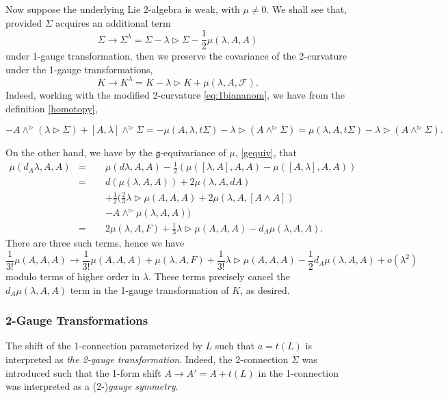 \documentclass[onecolumn]{article}
\theoremstyle{theorem}
\theoremstyle{remark}
\theoremstyle{example}
\theoremstyle{definition}
\numberwithin{equation}{section}
\def\g{\mathfrak g}
\begin{document}
Now suppose the underlying Lie 2-algebra is weak, with $\mu\neq 0$. We shall see that, provided $\Sigma$ acquires an additional term \cite{Kim:2019owc}
\begin{equation}
    \Sigma\rightarrow \Sigma^\lambda = \Sigma- \lambda\rhd\Sigma - \frac{1}{2}\mu(\lambda,A,A)\label{modified1gau}
\end{equation}
under 1-gauge transformation, then we preserve the covariance of the 2-curvature under the 1-gauge transformations,
\begin{equation}
    K\rightarrow K^\lambda = K - \lambda\rhd K + \mu(\lambda,A,\mathcal{F}).\nonumber
\end{equation}
{Indeed,} working with the modified 2-curvature  \eqref{eq:1biananom}, we have from the definition  \eqref{homotopy},
\begin{small}
\begin{equation}
    -A\wedge^\rhd(\lambda\rhd\Sigma) + [A,\lambda]\wedge^\rhd\Sigma = -\mu(A,\lambda,t\Sigma) - \lambda\rhd(A\wedge^\rhd\Sigma)= \mu(\lambda,A,t\Sigma) - \lambda\rhd(A\wedge^\rhd\Sigma).
\end{equation}\end{small}
{On} the other hand, we have by the $\g$-equivariance of $\mu$, \eqref{gequiv}, that
\begin{eqnarray}
    \mu(d_A\lambda,A,A) &=& \mu(d\lambda,A,A) - \frac{1}{2}(\mu([\lambda,A],A,A) - \mu([A,\lambda],A,A)) \nonumber\\
    &=& d(\mu(\lambda,A,A)) + 2\mu(\lambda,A,dA)\nonumber\\
    &\qquad& + \frac{1}{2}(\frac{2}{3}\lambda\rhd\mu(A,A,A)+2\mu(\lambda,A,[A\wedge A]) \nonumber\\
    &\qquad&-A\wedge^\rhd\mu(\lambda,A,A))\nonumber\\
    &=& 2\mu(\lambda,A,F)+\frac{1}{3}\lambda\rhd\mu(A,A,A)-d_A\mu(\lambda,A,A).\nonumber
\end{eqnarray}
{There} are three such terms, hence we have
\begin{equation}
    \frac{1}{3!}\mu(A,A,A)\rightarrow  \frac{1}{3!}\mu(A,A,A)+\mu(\lambda,A,F) +\frac{1}{3!}\lambda\rhd\mu(A,A,A)- \frac{1}{2}d_A\mu(\lambda,A,A) + o(\lambda^2)\nonumber 
\end{equation}
modulo terms of higher order in $\lambda$. These terms precisely cancel the $d_A\mu(\lambda,A,A)$ term in the 1-gauge transformation of $K$, as desired.


\subsubsection{2-Gauge Transformations}
The shift of the 1-connection parameterized by $L$ such that $a=t(L)$ is interpreted as \textit{{the 2-gauge transformation}}. Indeed, the 2-connection $\Sigma$ was introduced such that the 1-form shift $A\rightarrow A'=A+t(L)$ in the 1-connection was interpreted as a (2-)\textit{{gauge symmetry}}. 
\end{document}
